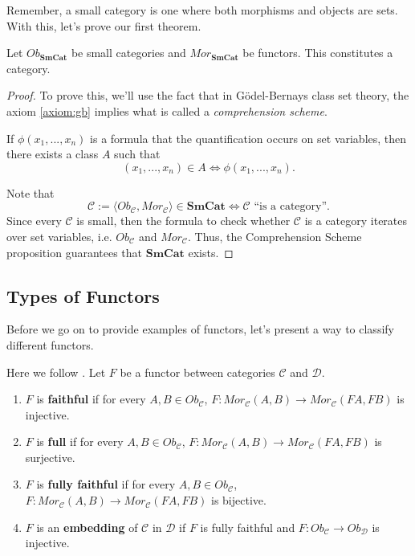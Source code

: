 Remember, a small category is one where both morphisms and objects are sets.
With this, let's prove our first theorem.
\begin{theorem}
  Let $Ob_{\textbf{SmCat}}$ be small categories and $Mor_{\textbf{SmCat}}$ be functors.
  This constitutes a category.
\end{theorem}
\begin{proof}
  To prove this, we'll use the fact that in Gödel-Bernays class set theory, the
  axiom \ref{axiom:gb} implies what is called a \textit{comprehension scheme}.
  \begin{proposition}
    If $\phi(x_1,...,x_n)$ is a formula that the quantification occurs on set variables, then
    there exists a class $A$ such that
    \begin{displaymath}
      (x_1,...,x_n) \in A \iff \phi(x_1,...,x_n).
    \end{displaymath}
  \end{proposition}
  Note that
  \begin{displaymath}
    \mathcal C := \langle Ob_\mathcal C, Mor_\mathcal C \rangle \in \textbf{SmCat} \iff
    \mathcal C \text{ ``is a category''}.
  \end{displaymath}
  Since every $\mathcal C$ is small, then the formula to check whether $\mathcal C$ is a category
  iterates over set variables, i.e. $Ob_\mathcal C$ and $Mor_\mathcal C$.
  Thus, the Comprehension Scheme proposition guarantees that $\textbf{SmCat}$ exists.
\end{proof}

\subsection{Types of Functors}

Before we go on to provide examples of functors, let's present
a way to classify different functors.

\begin{definition}
  Here we follow \citet{roman2017introduction}.
  Let $F$ be a functor between categories $\mathcal C$ and $\mathcal D$.
  \begin{enumerate}[1.]
    \item $F$ is \textbf{faithful} if for every $A,B \in Ob_\mathcal C$,
      $F:Mor_\mathcal C(A,B)\to Mor_\mathcal C(FA,FB)$ is injective.
    \item $F$ is \textbf{full} if for every $A,B \in Ob_\mathcal C$,
      $F:Mor_\mathcal C(A,B)\to Mor_\mathcal C(FA,FB)$ is surjective.
    \item $F$ is \textbf{fully faithful} if for every $A,B \in Ob_\mathcal C$,
      $F:Mor_\mathcal C(A,B)\to Mor_\mathcal C(FA,FB)$ is bijective.
    \item $F$ is an \textbf{embedding} of $\mathcal C$ in $\mathcal D$ if $F$ is fully faithful
      and $F:Ob_\mathcal C \to Ob_\mathcal D$ is injective.
  \end{enumerate}
 
\end{definition}

